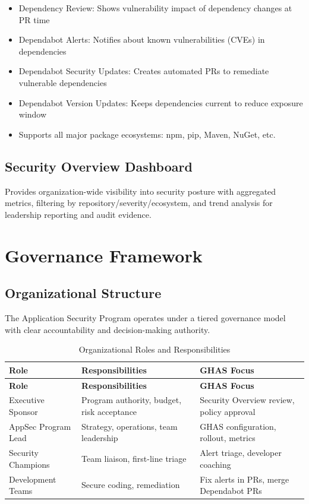 \documentclass[11pt]{article}
\begin{document}
\begin{itemize}[leftmargin=*]
\item Dependency Review: Shows vulnerability impact of dependency changes at PR time
\item Dependabot Alerts: Notifies about known vulnerabilities (CVEs) in dependencies
\item Dependabot Security Updates: Creates automated PRs to remediate vulnerable dependencies
\item Dependabot Version Updates: Keeps dependencies current to reduce exposure window
\item Supports all major package ecosystems: npm, pip, Maven, NuGet, etc.
\end{itemize}
\subsection{Security Overview Dashboard}

Provides organization-wide visibility into security posture with aggregated metrics, filtering by repository/severity/ecosystem, and trend analysis for leadership reporting and audit evidence.

\section{Governance Framework}

\subsection{Organizational Structure}

The Application Security Program operates under a tiered governance model with clear accountability and decision-making authority.

\begin{longtable}{p{}p{}p{}}
\caption{Organizational Roles and Responsibilities}\label{tab:org_roles}\\
\toprule
\textbf{Role} & \textbf{Responsibilities} & \textbf{GHAS Focus} \\
\midrule
\endfirsthead
\toprule
\textbf{Role} & \textbf{Responsibilities} & \textbf{GHAS Focus} \\
\midrule
\endhead
\bottomrule
\endfoot
Executive Sponsor & Program authority, budget, risk acceptance & Security Overview review, policy approval \\
AppSec Program Lead & Strategy, operations, team leadership & GHAS configuration, rollout, metrics \\
Security Champions & Team liaison, first-line triage & Alert triage, developer coaching \\
Development Teams & Secure coding, remediation & Fix alerts in PRs, merge Dependabot PRs \\
\end{longtable}
\end{document}
